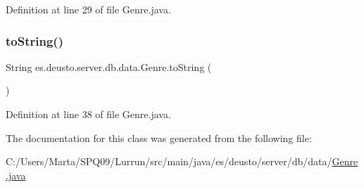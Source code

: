 Definition at line 29 of file Genre.\+java.

\mbox{\label{classes_1_1deusto_1_1server_1_1db_1_1data_1_1_genre_aeff531adb16e15f04a2f1a11b2b44af4}} 
\subsubsection{\texorpdfstring{to\+String()}{toString()}}
{\footnotesize\ttfamily String es.\+deusto.\+server.\+db.\+data.\+Genre.\+to\+String (\begin{DoxyParamCaption}{ }\end{DoxyParamCaption})}



Definition at line 38 of file Genre.\+java.



The documentation for this class was generated from the following file\+:\begin{DoxyCompactItemize}
\item 
C\+:/\+Users/\+Marta/\+S\+P\+Q09/\+Lurrun/src/main/java/es/deusto/server/db/data/\hyperlink{_genre_8java}{Genre.\+java}\end{DoxyCompactItemize}
